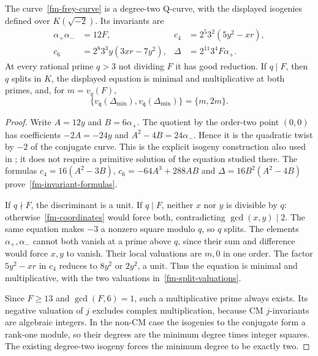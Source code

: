 \begin{lemma}\label{fm-invariants}
The curve~\eqref{fm-frey-curve} is a degree-two Q-curve, with the
displayed isogenies defined over $K(\sqrt{-2})$. Its invariants are
\begin{equation}\label{fm-invariant-formulas}
 \begin{aligned}
 \alpha_+\alpha_-&=12F,&
 c_4&=2^5 3^2(5y^2-xr),\\
 c_6&=2^8 3^3y(3xr-7y^2),&
 \Delta&=2^{11}3^4F\alpha_+.
 \end{aligned}
\end{equation}
At every rational prime $q>3$ not dividing $F$ it has good reduction.
If $q\mid F$, then $q$ splits in $K$, the displayed equation is minimal
and multiplicative at both primes, and, for $m=v_q(F)$,
\begin{equation}\label{fm-split-valuations}
 \{v_{\mathfrak q}(\Delta_{\min}),
       v_{\bar{\mathfrak q}}(\Delta_{\min})\}=\{m,2m\}.
\end{equation}
\end{lemma}
\begin{proof}
Write $A=12y$ and $B=6\alpha_+$. The quotient by the order-two point
$(0,0)$ has coefficients $-2A=-24y$ and
$A^2-4B=24\alpha_-$. Hence it is the quadratic twist by $-2$ of the
conjugate curve. This is the explicit isogeny construction also used in
\cite[Proposition~2.2]{PacettiVillagra2022QCurves}; it does not require a
primitive solution of the equation studied there.
The formulas
$c_4=16(A^2-3B)$, $c_6=-64A^3+288AB$ and
$\Delta=16B^2(A^2-4B)$ prove~\eqref{fm-invariant-formulas}.

If $q\nmid F$, the discriminant is a unit. If $q\mid F$, neither $x$
nor $y$ is divisible by $q$: otherwise~\eqref{fm-coordinates} would
force both, contradicting $\gcd(x,y)\mid2$. The same equation makes
$-3$ a nonzero square modulo $q$, so $q$ splits. The elements
$\alpha_+,\alpha_-$ cannot both vanish at a prime above $q$, since their
sum and difference would force $x,y$ to vanish. Their local valuations
are $m,0$ in one order. The factor $5y^2-xr$ in $c_4$ reduces to
$8y^2$ or $2y^2$, a unit. Thus the equation is minimal and multiplicative,
with the two valuations in~\eqref{fm-split-valuations}.

Since $F\ge13$ and $\gcd(F,6)=1$, such a multiplicative prime always
exists. Its negative valuation of $j$ excludes complex multiplication,
because CM $j$-invariants are algebraic integers. In the non-CM case the
isogenies to the conjugate form a rank-one module, so their degrees are
the minimum degree times integer squares. The existing degree-two
isogeny forces the minimum degree to be exactly two.
\end{proof}

